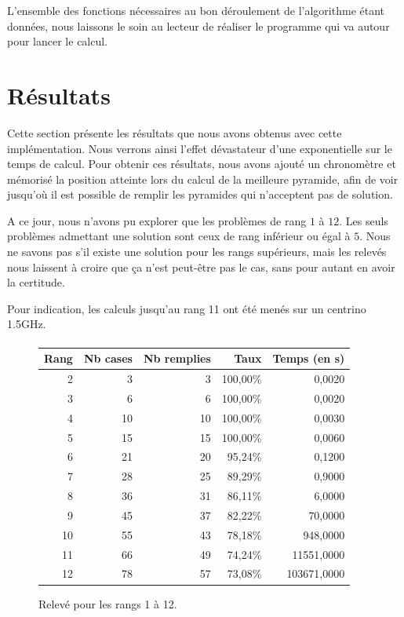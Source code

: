 \documentclass[10pt]{article}%
\begin{document}
  L'ensemble des fonctions nécessaires au bon déroulement de l'algorithme étant
  données, nous laissons le soin au lecteur de réaliser le programme qui va autour
  pour lancer le calcul.

\section{Résultats}
  Cette section présente les résultats que nous avons obtenus avec cette implémentation.
  Nous verrons ainsi l'effet dévastateur d'une exponentielle sur le temps de calcul.
  Pour obtenir ces résultats, nous avons ajouté un chronomètre et mémorisé la position
  atteinte lors du calcul de la meilleure pyramide, afin de voir jusqu'où il est possible
  de remplir les pyramides qui n'acceptent pas de solution.

  A ce jour, nous n'avons pu explorer que les problèmes de rang $1$ à $12$.
  Les seuls problèmes admettant une solution sont ceux de rang inférieur ou égal à $5$.
  Nous ne savons pas s'il existe une solution pour les rangs supérieurs, mais les relevés
  nous laissent à croire que ça n'est peut-être pas le cas, sans pour autant en avoir la certitude.

  Pour indication, les calculs jusqu'au rang 11 ont été menés sur un centrino 1.5GHz.
\paragraph*{}
\begin{figure}[h]
\centering
\begin{tabular}{|r|r|r|r|r|}
\hline
Rang & Nb cases & Nb remplies & Taux & Temps (en s)\\
\hline
2 & 3 & 3 & 100,00\% & 0,0020\\
3 & 6 & 6 & 100,00\% & 0,0020\\
4 & 10 & 10 & 100,00\% & 0,0030\\
5 & 15 & 15 & 100,00\% & 0,0060\\
6 & 21 & 20 & 95,24\% & 0,1200\\
7 & 28 & 25 & 89,29\% & 0,9000\\
8 & 36 & 31 & 86,11\% & 6,0000\\
9 & 45 & 37 & 82,22\% & 70,0000\\
10 & 55 & 43 & 78,18\% & 948,0000\\
11 & 66 & 49 & 74,24\% & 11551,0000\\
12 & 78 & 57 & 73,08\% & 103671,0000\\
\hline
\end{tabular}
\caption{Relevé pour les rangs 1 à 12.}
\label{tab:releve}
\end{figure}
\end{document}
